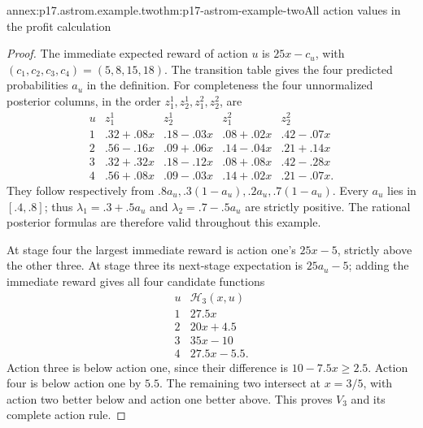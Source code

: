 \begin{annexitem}{annex:p17.astrom.example.two}{thm:p17-astrom-example-two}{All action values in the profit calculation}
\begin{proof}
The immediate expected reward of action \(u\) is
\(25x-c_u\), with
\((c_1,c_2,c_3,c_4)=(5,8,15,18)\).
The transition table gives the four predicted
probabilities \(a_u\) in the definition.
For completeness the four unnormalized posterior
columns, in the order \(z_1^1,z_2^1,z_1^2,z_2^2\), are
\[
 \begin{array}{c|rrrr}
 u&z_1^1&z_2^1&z_1^2&z_2^2\\ \hline
 1&.32+.08x&.18-.03x&.08+.02x&.42-.07x\\
 2&.56-.16x&.09+.06x&.14-.04x&.21+.14x\\
 3&.32+.32x&.18-.12x&.08+.08x&.42-.28x\\
 4&.56+.08x&.09-.03x&.14+.02x&.21-.07x .
 \end{array}
\]
They follow respectively from
\(.8a_u,.3(1-a_u),.2a_u,.7(1-a_u)\).
Every \(a_u\) lies in \([.4,.8]\);
thus \(\lambda_1=.3+.5a_u\) and
\(\lambda_2=.7-.5a_u\) are strictly positive.
The rational posterior formulas are therefore valid
throughout this example.

At stage four the largest immediate reward is action
one's \(25x-5\), strictly above the other three.
At stage three its next-stage expectation is
\(25a_u-5\); adding the immediate reward gives
all four candidate functions
\[
 \begin{array}{c|r}
 u&\mathcal H_3(x,u)\\ \hline
 1&27.5x\\
 2&20x+4.5\\
 3&35x-10\\
 4&27.5x-5.5 .
 \end{array}
\]
Action three is below action one, since their
difference is \(10-7.5x\geq2.5\).
Action four is below action one by \(5.5\).
The remaining two intersect at \(x=3/5\), with
action two better below and action one better above.
This proves \(V_3\) and its complete action rule.


\end{proof}
\end{annexitem}

